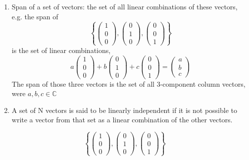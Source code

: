 \documentclass[a4paper,11pt,normalem]{article}
\begin{document}
\begin{enumerate}
\item
  Span of a set of vectors: the set of all linear combinations of these
  vectors, e.g. the span of
\[
    \left\{ \begin{pmatrix} 1 \\ 0 \\ 0 \end{pmatrix}, \begin{pmatrix} 0 \\ 1 \\ 0 \end{pmatrix}, \begin{pmatrix} 0 \\ 0 \\ 1 \end{pmatrix} \right\}
\]
is the set of linear combinations,
\[
    a\begin{pmatrix} 1 \\ 0 \\ 0 \end{pmatrix} + b\begin{pmatrix} 0 \\ 1 \\ 0 \end{pmatrix} + c\begin{pmatrix} 0 \\ 0 \\ 1 \end{pmatrix} = \begin{pmatrix} a \\ b \\ c \end{pmatrix}
\]
The span of those three vectors is the set of all 3-component column
vectors, were \(a, b, c \in \mathbb{C}\)
\item
  A set of N vectors is said to be linearly independent if it is not
  possible to write a vector from that set as a linear combination of
  the other vectors.
\end{enumerate}
\[
    \left\{ \begin{pmatrix} 1 \\ 0 \\ 0 \end{pmatrix}, \begin{pmatrix} 0 \\ 1 \\ 0 \end{pmatrix}, \begin{pmatrix} 0 \\ 0 \\ 1 \end{pmatrix} \right\}
\]
\end{document}
